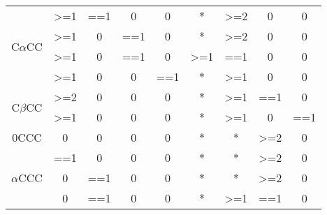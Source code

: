 \documentclass[fleqn]{article}
\begin{document}
\begin {table} [h]
\begin{tabular}{|c|c|c|c|c|c|c|c|c|}
\multirow{4}{*}{C$\alpha$CC} & \textgreater{}=1                & ==1                             & 0                & 0   & *                                & \textgreater{}=2                & 0                & 0   \\ \cline{2-9} 
                             & \textgreater{}=1                & 0                               & ==1              & 0   & *                                & \textgreater{}=2                & 0                & 0   \\ \cline{2-9} 
                             & \textgreater{}=1                & 0                               & ==1              & 0   & \textgreater{}=1                 & ==1                             & 0                & 0   \\ \cline{2-9} 
                             & \textgreater{}=1                & 0                               & 0                & ==1 & *                                & \textgreater{}=1                & 0                & 0   \\ \hline
\multirow{2}{*}{C$\beta$CC}  & \textgreater{}=2                & 0                               & 0                & 0   & *                                & \textgreater{}=1                & ==1              & 0   \\ \cline{2-9} 
                             & \textgreater{}=1                & 0                               & 0                & 0   & *                                & \textgreater{}=1                & 0                & ==1 \\ \hline
0CCC                         & 0                               & 0                               & 0                & 0   & *                                & *                               & \textgreater{}=2 & 0   \\ \hline
\multirow{6}{*}{$\alpha$CCC} & ==1                             & 0                               & 0                & 0   & *                                & *                               & \textgreater{}=2 & 0   \\ \cline{2-9} 
                             & 0                               & ==1                             & 0                & 0   & *                                & *                               & \textgreater{}=2 & 0   \\ \cline{2-9} 
                             & 0                               & ==1                             & 0                & 0   & *                                & \textgreater{}=1                & ==1              & 0   \\ \cline{2-9} 

\end{tabular}
\end{table}
\end{document}
